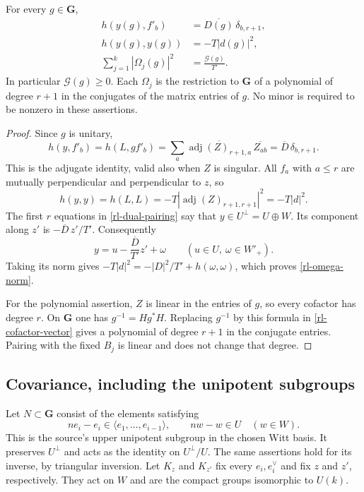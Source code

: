 \begin{lemma}\label{rl-cofactor-norm}
For every $g\in\mathbf G$,
\begin{align}
 h(y(g),f'_b)&=\overline{D(g)}\,\delta_{b,r+1},
                                                  \label{rl-dual-pairing}\\
 h(y(g),y(g))&=-T|d(g)|^2,\label{rl-y-norm}\\
 \sum_{j=1}^k|\Omega_j(g)|^2
             &=\frac{\mathcal G(g)}{T'}.\label{rl-omega-norm}
\end{align}
In particular $\mathcal G(g)\geq0$.
Each $\Omega_j$ is the restriction to $\mathbf G$ of a
polynomial of degree $r+1$ in the conjugates of the
matrix entries of $g$.
No minor is required to be nonzero in these assertions.
\end{lemma}

\begin{proof}
Since $g$ is unitary,
\[
 h(y,f'_b)=h(L,gf'_b)
   =\sum_a
     \overline{\operatorname{adj}(Z)_{r+1,a}}\,
     \overline{Z_{ab}}
   =\overline{D}\,\delta_{b,r+1}.
\]
This is the adjugate identity, valid also when $Z$ is singular.
All $f_a$ with $a\leq r$ are mutually perpendicular
and perpendicular to $z$, so
\[
 h(y,y)=h(L,L)
       =-T|\operatorname{adj}(Z)_{r+1,r+1}|^2
       =-T|d|^2.
\]
The first $r$ equations in \eqref{rl-dual-pairing}
say that $y\in U^\perp=U\oplus W$.
Its component along $z'$ is
$-\overline D\,z'/T'$.  Consequently
\[
           y=u-\frac{\overline D}{T'}z'+\omega
                          \qquad(u\in U,\ \omega\in W'_+).
\]
Taking its norm gives
$-T|d|^2=-|D|^2/T'+h(\omega,\omega)$,
which proves \eqref{rl-omega-norm}.

For the polynomial assertion, $Z$ is linear in the
entries of $g$, so every cofactor has degree $r$.
On $\mathbf G$ one has $g^{-1}=Hg^*H$.
Replacing $g^{-1}$ by this formula in
\eqref{rl-cofactor-vector} gives a polynomial of
degree $r+1$ in the conjugate entries.
Pairing with the fixed $B_j$ is linear and does not
change that degree.
\end{proof}

\subsection{Covariance, including the unipotent subgroups}

Let $N\subset\mathbf G$ consist of the elements satisfying
\[
 n e_i-e_i\in\langle e_1,\ldots,e_{i-1}\rangle,
       \qquad n w-w\in U\quad(w\in W).
\]
This is the source's upper unipotent subgroup in the
chosen Witt basis.  It preserves $U^\perp$ and acts
as the identity on $U^\perp/U$.  The same assertions
hold for its inverse, by triangular inversion.
Let $K_z$ and $K_{z'}$ fix every $e_i,e_i^\vee$
and fix $z$ and $z'$, respectively.  They act on
$W$ and are the compact groups isomorphic to $U(k)$.


